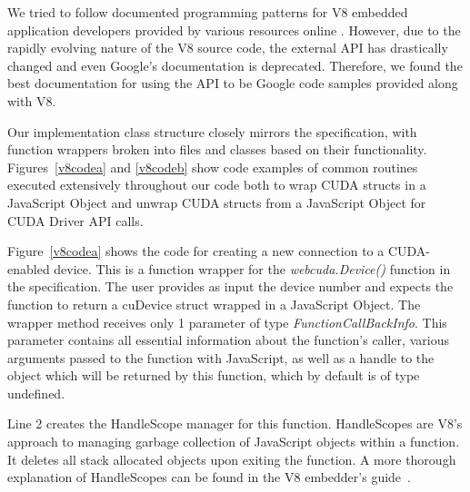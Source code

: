 We tried to follow documented programming patterns for V8 embedded application
developers provided by various resources online \cite{embeddersGuide,
nodeJSDocumentation}. However, due to the rapidly evolving nature of the V8
source code, the external API has drastically changed and even Google's
documentation \cite{embeddersGuide} is deprecated. Therefore, we found the best
documentation for using the API to be Google code samples provided along with
V8.

\begin{figure*}
	\begin{center}
		\small
		
\end{center}
\caption{Creating new \name Device Object}
\label{v8codea}
	\begin{center}
		\small
		
\end{center}
\caption{C++ Implementation of \namens's \textit{webcuda.free()} method}
\label{v8codeb}

\end{figure*}

Our implementation class structure closely mirrors the specification, with
function wrappers broken into files and classes based on their functionality.
Figures~\ref{v8codea} and \ref{v8codeb} show code examples of common routines
executed extensively throughout our code both to wrap CUDA structs in a
JavaScript Object and unwrap CUDA structs from a JavaScript Object for CUDA
Driver API calls.  

Figure~\ref{v8codea} shows the code for creating a new connection to a
CUDA-enabled device. This is a function wrapper for the \textit{webcuda.Device()}
function in the \name specification. The user provides as input the device
number and expects the function to return a cuDevice struct wrapped in a
JavaScript Object.  The wrapper method receives only 1 parameter of type
\textit{FunctionCallBackInfo}. This parameter contains all essential information
about the function's caller, various arguments passed to the function with
JavaScript, as well as a handle to the object which will be returned by this
function, which by default is of type undefined. 

Line 2 creates the HandleScope manager for this function.  HandleScopes are V8's
approach to managing garbage collection of JavaScript objects within a function. It
deletes all stack allocated objects upon exiting the function.  A more
thorough explanation of HandleScopes can be found in the V8 embedder's
guide~\cite{embeddersGuide}.  

